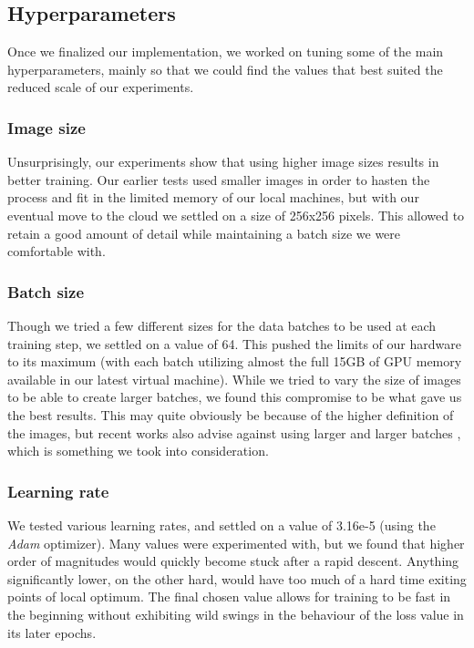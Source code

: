 \documentclass[twoside,twocolumn]{article}
\begin{document}
\subsection{Hyperparameters}

Once we finalized our implementation, we worked on tuning some of the main hyperparameters, mainly so that we could find the values that best suited the reduced scale of our experiments. 

\subsubsection{Image size}
Unsurprisingly, our experiments show that using higher image sizes results in better training. Our earlier tests used smaller images in order to hasten the process and fit in the limited memory of our local machines, but with our eventual move to the cloud we settled on a size of 256x256 pixels. This allowed to retain a good amount of detail while maintaining a batch size we were comfortable with.

\subsubsection{Batch size}
Though we tried a few different sizes for the data batches to be used at each training step, we settled on a value of 64. This pushed the limits of our hardware to its maximum (with each batch utilizing almost the full 15GB of GPU memory available in our latest virtual machine). While we tried to vary the size of images to be able to create larger batches, we found this compromise to be what gave us the best results. This may quite obviously be because of the higher definition of the images, but recent works also advise against using larger and larger batches \cite{Nitish:2017}, which is something we took into consideration.

\subsubsection{Learning rate}
We tested various learning rates, and settled on a value of  3.16e-5 (using the \textit{Adam} optimizer). Many values were experimented with, but we found that higher order of magnitudes would quickly become stuck after a rapid descent. Anything significantly lower, on the other hard, would have too much of a hard time exiting points of local optimum.
The final chosen value allows for training to be fast in the beginning without exhibiting wild swings in the behaviour of the loss value in its later epochs.
\end{document}

